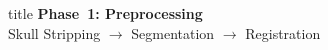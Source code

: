 \documentclass[aspectratio=169,xcolor=dvipsnames]{beamer}
\begin{document}
\begin{frame}[plain]
    \centering
    \vfill
    \begin{beamercolorbox}[center,shadow=true,rounded=true]{title}
        \textbf{Phase~1: Preprocessing}\\
        \vspace{0.5em}
        \large Skull Stripping $\to$ Segmentation $\to$ Registration
    \end{beamercolorbox}
    \vfill
\end{frame}

\end{document}
